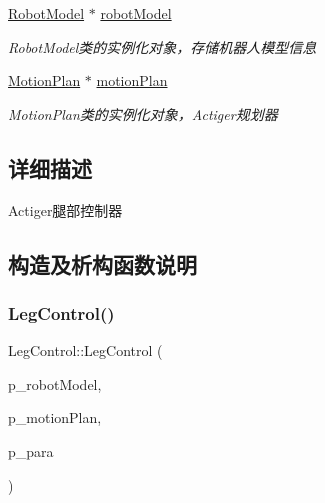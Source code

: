 \begin{DoxyCompactItemize}
\mbox{\label{classquadruped_1_1LegControl_a6ae83b1ecf23f1197aac011643f54f7a}} 
\hyperlink{classquadruped_1_1RobotModel}{Robot\+Model} $\ast$ \hyperlink{classquadruped_1_1LegControl_a6ae83b1ecf23f1197aac011643f54f7a}{robot\+Model}
\begin{DoxyCompactList}\small\item\em Robot\+Model类的实例化对象，存储机器人模型信息 \end{DoxyCompactList}\item 
\mbox{\label{classquadruped_1_1LegControl_abae0fb2dd891f688b23beffe8f6cb951}} 
\hyperlink{classquadruped_1_1MotionPlan}{Motion\+Plan} $\ast$ \hyperlink{classquadruped_1_1LegControl_abae0fb2dd891f688b23beffe8f6cb951}{motion\+Plan}
\begin{DoxyCompactList}\small\item\em Motion\+Plan类的实例化对象，\+Actiger规划器 \end{DoxyCompactList}\end{DoxyCompactItemize}


\subsection{详细描述}
Actiger腿部控制器 

\subsection{构造及析构函数说明}
\mbox{\label{classquadruped_1_1LegControl_a65fe75308c2c86983d286fda86fe941e}} 
\subsubsection{\texorpdfstring{Leg\+Control()}{LegControl()}}
{\footnotesize\ttfamily Leg\+Control\+::\+Leg\+Control (\begin{DoxyParamCaption}\item[{\hyperlink{classquadruped_1_1RobotModel}{Robot\+Model} $\ast$}]{p\+\_\+robot\+Model,  }\item[{\hyperlink{classquadruped_1_1MotionPlan}{Motion\+Plan} $\ast$}]{p\+\_\+motion\+Plan,  }\item[{\hyperlink{classquadruped_1_1Parameters}{Parameters} $\ast$}]{p\+\_\+para }\end{DoxyParamCaption})\hspace{0.3cm}{\ttfamily [explicit]}}




